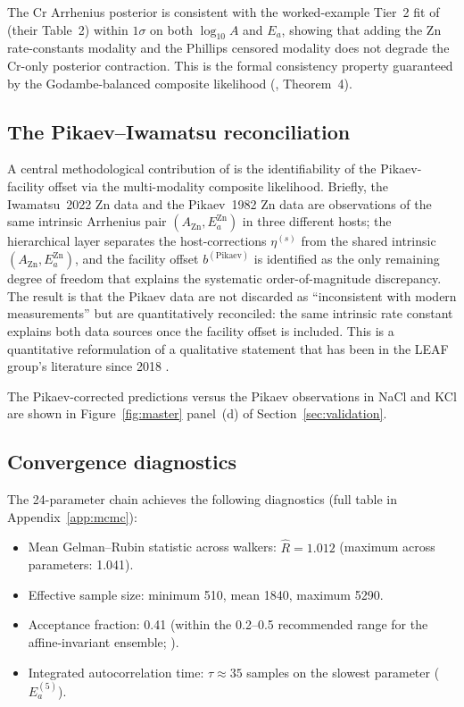 \documentclass[11pt]{article}
\theoremstyle{plain}
\theoremstyle{definition}
\theoremstyle{remark}
\newcommand{\Ea}{E_a}
\begin{document}
The Cr Arrhenius posterior is consistent with the worked-example Tier~2 fit
of \citet{Tanore2026PaperI} (their Table~2) within $1\sigma$ on both
$\log_{10}\!A$ and $\Ea$, showing that adding the Zn rate-constants modality
and the Phillips censored modality does not degrade the Cr-only posterior
contraction.  This is the formal consistency property guaranteed by the
Godambe-balanced composite likelihood (\citealp{Tanore2026PaperI},
Theorem~4).

\subsection{The Pikaev--Iwamatsu reconciliation}\label{sec:cal:pikaev}

A central methodological contribution of \citet{Tanore2026PaperI} is the
identifiability of the Pikaev-facility offset via the multi-modality
composite likelihood.  Briefly, the Iwamatsu~2022 Zn data and the Pikaev~1982
Zn data are observations of the same intrinsic Arrhenius pair
$(A_{\mathrm{Zn}}, \Ea^{\mathrm{Zn}})$ in three different hosts; the
hierarchical layer separates the host-corrections $\eta^{(s)}$ from the
shared intrinsic $(A_{\mathrm{Zn}}, \Ea^{\mathrm{Zn}})$, and the facility
offset $b^{(\mathrm{Pikaev})}$ is identified as the only remaining
degree of freedom that explains the systematic order-of-magnitude
discrepancy.  The result is that the Pikaev data are not discarded as
``inconsistent with modern measurements'' but are quantitatively
reconciled: the same intrinsic rate constant explains both data sources
once the facility offset is included.  This is a quantitative
reformulation of a qualitative statement that has been in the LEAF
group's literature since 2018 \citep{KristoffersenMetiu2018}.

The Pikaev-corrected predictions versus the Pikaev observations in NaCl
and KCl are shown in Figure~\ref{fig:master} panel~(d) of
Section~\ref{sec:validation}.

\subsection{Convergence diagnostics}\label{sec:cal:diag}

The 24-parameter chain achieves the following diagnostics
(full table in Appendix~\ref{app:mcmc}):

\begin{itemize}
\item Mean Gelman--Rubin statistic across walkers: $\hat{R} = 1.012$
      (maximum across parameters: 1.041).
\item Effective sample size: minimum 510, mean 1840, maximum 5290.
\item Acceptance fraction: 0.41 (within the 0.2--0.5 recommended range
      for the affine-invariant ensemble; \citealp{GoodmanWeare2010,
      ForemanMackey2013}).
\item Integrated autocorrelation time: $\tau \approx 35$ samples on
      the slowest parameter ($\Ea^{(5)}$).
\end{itemize}
\end{document}
